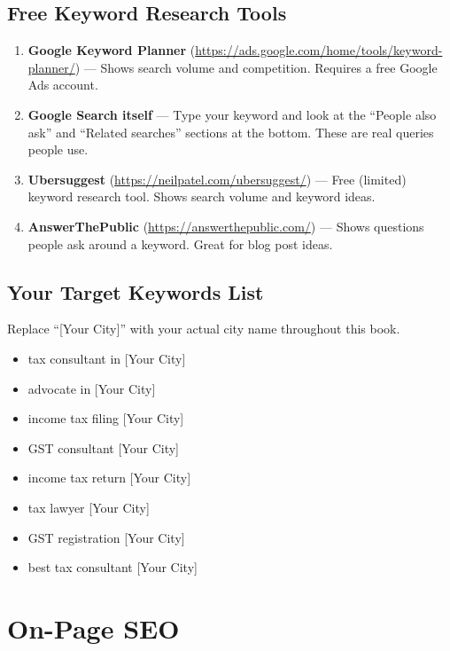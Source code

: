 \documentclass[12pt, a4paper]{book}
\begin{document}
\subsection{Free Keyword Research Tools}

\begin{enumerate}[leftmargin=1.5em]
  \item \textbf{Google Keyword Planner} (\url{https://ads.google.com/home/tools/keyword-planner/})
    --- Shows search volume and competition. Requires a free Google Ads account.
  \item \textbf{Google Search itself} --- Type your keyword and look at the
    ``People also ask'' and ``Related searches'' sections at the bottom.
    These are real queries people use.
  \item \textbf{Ubersuggest} (\url{https://neilpatel.com/ubersuggest/})
    --- Free (limited) keyword research tool. Shows search volume and keyword ideas.
  \item \textbf{AnswerThePublic} (\url{https://answerthepublic.com/})
    --- Shows questions people ask around a keyword. Great for blog post ideas.
\end{enumerate}

\subsection{Your Target Keywords List}

Replace ``[Your City]'' with your actual city name throughout this book.

\begin{itemize}[leftmargin=1.5em]
  \item tax consultant in [Your City]
  \item advocate in [Your City]
  \item income tax filing [Your City]
  \item GST consultant [Your City]
  \item income tax return [Your City]
  \item tax lawyer [Your City]
  \item GST registration [Your City]
  \item best tax consultant [Your City]
\end{itemize}

\section{On-Page SEO}
\end{document}
